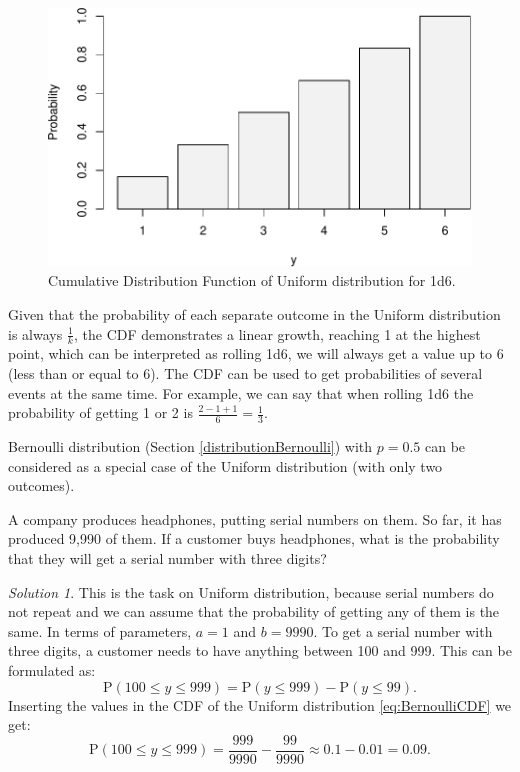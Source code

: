 \documentclass[
]{book}
\theoremstyle{definition}
\theoremstyle{definition}
\theoremstyle{definition}
\theoremstyle{definition}
\theoremstyle{remark}
\newtheorem*{solution}{Solution}
\begin{document}
\begin{figure}
\centering
\includegraphics{Svetunkov---Statistics-for-Business-Analytics_files/figure-latex/uniformCDF-1.pdf}
\caption{\label{fig:uniformCDF}Cumulative Distribution Function of Uniform distribution for 1d6.}
\end{figure}

Given that the probability of each separate outcome in the Uniform distribution is always \(\frac{1}{k}\), the CDF demonstrates a linear growth, reaching 1 at the highest point, which can be interpreted as rolling 1d6, we will always get a value up to 6 (less than or equal to 6). The CDF can be used to get probabilities of several events at the same time. For example, we can say that when rolling 1d6 the probability of getting 1 or 2 is \(\frac{2-1+1}{6}=\frac{1}{3}\).

Bernoulli distribution (Section \ref{distributionBernoulli}) with \(p=0.5\) can be considered as a special case of the Uniform distribution (with only two outcomes).

A company produces headphones, putting serial numbers on them. So far, it has produced 9,990 of them. If a customer buys headphones, what is the probability that they will get a serial number with three digits?

\begin{solution}
This is the task on Uniform distribution, because serial numbers do not repeat and we can assume that the probability of getting any of them is the same. In terms of parameters, \(a=1\) and \(b=9990\). To get a serial number with three digits, a customer needs to have anything between 100 and 999. This can be formulated as:
\begin{equation*}
    \mathrm{P}(100 \leq y \leq 999) = \mathrm{P}(y \leq 999) - \mathrm{P}(y \leq 99).
\end{equation*}
Inserting the values in the CDF of the Uniform distribution \eqref{eq:BernoulliCDF} we get:
\begin{equation*}
    \mathrm{P}(100 \leq y \leq 999) = \frac{999}{9990} - \frac{99}{9990} \approx 0.1 - 0.01 = 0.09.
\end{equation*}
\end{solution}
\end{document}
